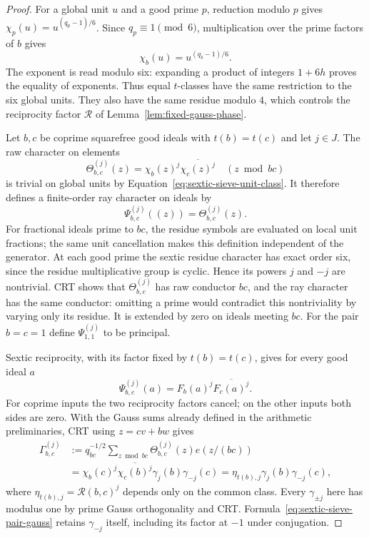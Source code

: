 \documentclass[11pt,a4paper]{article}
\numberwithin{equation}{section}
\numberwithin{figure}{section}
\theoremstyle{definition}
\theoremstyle{remark}
\begin{document}
\begin{proof}
For a global unit $u$ and a good prime $p$, reduction modulo $p$ gives
$\chi_p(u)=u^{(q_p-1)/6}$.  Since $q_p\equiv1\pmod6$, multiplication over
the prime factors of $b$ gives
\begin{equation}\label{eq:sextic-sieve-unit-class}
 \chi_b(u)=u^{(q_b-1)/6}.
\end{equation}
The exponent is read modulo six: expanding a product of integers
$1+6h$ proves the equality of exponents.  Thus equal $t$-classes have
the same restriction to the six global units.  They also have the same
residue modulo $4$, which controls the reciprocity factor
$\mathcal R$ of Lemma~\ref{lem:fixed-gauss-phase}.

Let $b,c$ be coprime squarefree good ideals with $t(b)=t(c)$ and let
$j\in J$.  The raw character on elements
\[
 \Theta_{b,c}^{(j)}(z)=\chi_b(z)^j\overline{\chi_c(z)^j}
       \quad (z\bmod bc)
\]
is trivial on global units by Equation~\eqref{eq:sextic-sieve-unit-class}.
It therefore defines a finite-order ray character on ideals by
\[
 \Psi_{b,c}^{(j)}((z))=\Theta_{b,c}^{(j)}(z).
\]
For fractional ideals prime to $bc$, the residue symbols are evaluated
on local unit fractions; the same unit cancellation makes this definition
independent of the generator.  At each good prime the sextic residue
character has exact order six, since the residue multiplicative group is
cyclic.  Hence its powers $j$ and $-j$ are nontrivial.  CRT shows that
$\Theta_{b,c}^{(j)}$ has raw conductor $bc$, and the ray character has the
same conductor: omitting a prime would contradict this nontriviality by
varying only its residue.  It is extended by zero on ideals meeting $bc$.
For the pair $b=c=1$ define $\Psi_{1,1}^{(j)}$ to be principal.

Sextic reciprocity, with its factor fixed by $t(b)=t(c)$, gives for every
good ideal $a$
\begin{equation}\label{eq:sextic-sieve-pair-values}
 \Psi_{b,c}^{(j)}(a)=F_b(a)^j\overline{F_c(a)^j}.
\end{equation}
For coprime inputs the two reciprocity factors cancel; on the other inputs
both sides are zero.  With the Gauss sums already defined in the arithmetic
preliminaries, CRT using $z=cv+bw$ gives
\begin{equation}\label{eq:sextic-sieve-pair-gauss}
 \begin{split}
 \Gamma_{b,c}^{(j)}
 &:=q_{bc}^{-1/2}\sum_{z\bmod bc}\Theta_{b,c}^{(j)}(z)e(z/(bc))\\
 &=\chi_b(c)^j\overline{\chi_c(b)^j}\gamma_j(b)\gamma_{-j}(c)
  =\eta_{t(b),j}\gamma_j(b)\gamma_{-j}(c),
 \end{split}
\end{equation}
where $\eta_{t(b),j}=\mathcal R(b,c)^j$ depends only on the common class.
Every $\gamma_{\pm j}$ here has modulus one by prime Gauss orthogonality
and CRT.  Formula~\eqref{eq:sextic-sieve-pair-gauss} retains
$\gamma_{-j}$ itself, including its factor at $-1$ under conjugation.


\end{proof}
\end{document}
